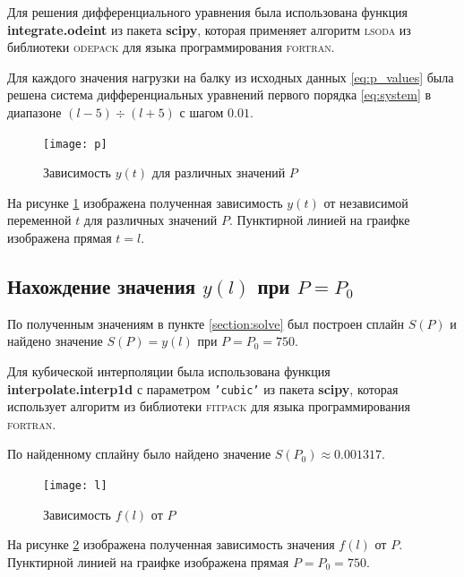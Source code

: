 Для решения дифференциального уравнения была использована функция \textbf{integrate.odeint} из пакета \textbf{scipy}, которая применяет алгоритм \textsc{lsoda} из библиотеки \textsc{odepack} для языка программирования \textsc{fortran}.

Для каждого значения нагрузки на балку из исходных данных \ref{eq:p_values} была решена система дифференциальных уравнений первого порядка \ref{eq:system} в диапазоне $(l-5) \div (l+5)$ с шагом $0.01$.

\begin{figure}[H]
\begin{center}
	\vspace{-0.5cm}
	\texttt{[image: p]}
	\caption{Зависимость $y(t)$ для различных значений $P$}
	\label{plt:p}
	\vspace{-0.5cm}
\end{center}
\end{figure}

На рисунке \ref{plt:p} изображена полученная зависимость $y(t)$ от независимой переменной $t$ для различных значений $P$. Пунктирной линией на граифке изображена прямая $t = l$.

\subsection{Нахождение значения $y(l)$ при $P = P_0$}

По полученным значениям в пункте \ref{section:solve} был построен сплайн $S(P)$ и найдено значение $S(P) = y(l)$ при $P = P_0 = 750$.

Для кубической интерполяции была использована функция \textbf{interpolate.interp1d} с параметром \texttt{'cubic'} из пакета \textbf{scipy}, которая использует алгоритм из библиотеки \textsc{fitpack} для языка программирования \textsc{fortran}.

По найденному сплайну было найдено значение $S(P_0) \approx 0.001317$.

\begin{figure}[H]
\begin{center}
	\vspace{-0.5cm}
	\texttt{[image: l]}
	\caption{Зависимость $f(l)$ от $P$}
	\label{plt:l}
	\vspace{-0.5cm}
\end{center}
\end{figure}

На рисунке \ref{plt:l} изображена полученная зависимость значения $f(l)$ от $P$. Пунктирной линией на граифке изображена прямая $P = P_0 = 750$.

